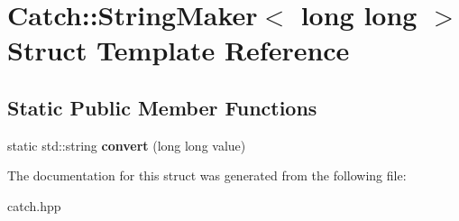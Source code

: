 \hypertarget{structCatch_1_1StringMaker_3_01long_01long_01_4}{}\section{Catch\+::String\+Maker$<$ long long $>$ Struct Template Reference}
\label{structCatch_1_1StringMaker_3_01long_01long_01_4}
\subsection*{Static Public Member Functions}
\begin{DoxyCompactItemize}
\item 
\mbox{\label{structCatch_1_1StringMaker_3_01long_01long_01_4_a7a58929dca2a14c576d7d6d08bc615d2}} 
static std\+::string {\bfseries convert} (long long value)
\end{DoxyCompactItemize}


The documentation for this struct was generated from the following file\+:\begin{DoxyCompactItemize}
\item 
catch.\+hpp\end{DoxyCompactItemize}
